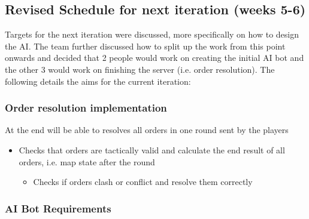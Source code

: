 \documentclass[12pt]{article}
\begin{document}
\subsection{Revised Schedule for next iteration (weeks 5-6)}

Targets for the next iteration were discussed, more specifically on
how to design the AI. The team further discussed how to split up the
work from this point onwards and decided that 2 people would work
on creating the initial AI bot and the other 3 would work on finishing
the server (i.e. order resolution). The following details the aims for the current iteration:


\subsubsection{Order resolution implementation}

At the end will be able to resolves all orders in one round sent by
the players
\begin{itemize}
\item Checks that orders are tactically valid and calculate the end result
of all orders, i.e. map state after the round

\begin{itemize}
\item Checks if orders clash or conflict and resolve them correctly
\end{itemize}
\end{itemize}

\subsubsection{AI Bot Requirements}
\end{document}
